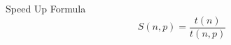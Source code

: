 \documentclass[11pt,a4paper]{article}
\begin{document}
Speed Up Formula
$$ S(n,p) = \frac{t(n)}{t(n,p)} $$


\listoffigures

\listoftables






\end{document}
